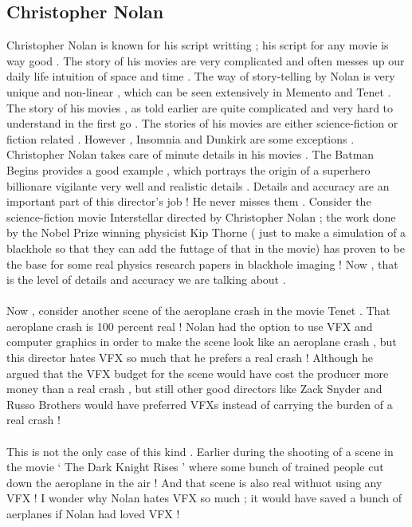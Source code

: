 \documentclass[14pt]{article}
\begin{document}
	\subsection{Christopher Nolan}
		Christopher Nolan is known for his script writting ; his script for any movie is way good . The story of his movies are very complicated and often messes up our daily life intuition of space and time . The way of story-telling by Nolan is very unique and non-linear , which can be seen extensively in Memento and Tenet . The story of his movies , as told earlier are quite complicated and very hard to understand in the first go . The stories of his movies are either science-fiction or fiction related . However , Insomnia and Dunkirk are some exceptions . Christopher Nolan takes care of minute details in his movies . The Batman Begins provides a good example , which portrays the origin of a superhero billionare vigilante very well and realistic details . Details and accuracy are an important part of this director's job ! He never misses them . Consider the science-fiction movie Interstellar directed by Christopher Nolan ; the work done by the Nobel Prize winning physicist Kip Thorne ( just to make a simulation of a blackhole so that they can add the futtage of that in the movie) has proven to be the base for some real physics research papers in blackhole imaging ! Now , that is the level of details and accuracy we are talking about .
		\\\\Now , consider another scene of the aeroplane crash in the movie Tenet . That aeroplane crash is 100 percent real ! Nolan had the option to use VFX and computer graphics in order to make the scene look like an aeroplane crash , but this director hates VFX so much that he prefers a real crash ! Although he argued that the VFX budget for the scene would have cost the producer more money than a real crash , but still other good directors like Zack Snyder and Russo Brothers would have preferred VFXs instead of carrying the burden of a real crash !
		\\\\This is not the only case of this kind . Earlier during the shooting of a scene in the movie ` The Dark Knight Rises ' where some bunch of trained people cut down the aeroplane in the air ! And that scene is also real withuot using any VFX ! I wonder why Nolan hates VFX so much ; it would have saved a bunch of aerplanes if Nolan had loved VFX !
\end{document}
